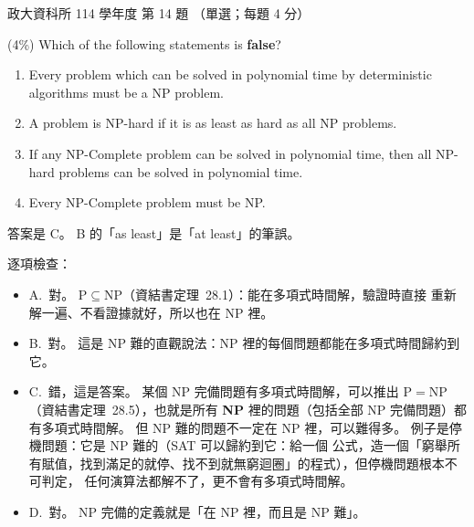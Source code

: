 \begin{pastexam}[label={px:nccu-114-dsa-14}]{政大資科所 114 學年度 第 14 題}
（單選；每題 4 分）

(4\%) Which of the following statements is \textbf{false}?
\begin{enumerate}[label=\Alph*.]
\item Every problem which can be solved in polynomial time by deterministic algorithms must be a NP
problem.
\item A problem is NP-hard if it is as least as hard as all NP problems.
\item If any NP-Complete problem can be solved in polynomial time, then all NP-hard problems can be
solved in polynomial time.
\item Every NP-Complete problem must be NP.
\end{enumerate}
\end{pastexam}

\begin{pastsoln}
答案是 C。 B 的「as least」是「at least」的筆誤。

逐項檢查：
\begin{itemize}
\item A.~對。 $\mathrm{P} \subseteq \mathrm{NP}$（資結書定理~28.1）：能在多項式時間解，驗證時直接
重新解一遍、不看證據就好，所以也在 NP 裡。
\item B.~對。 這是 NP 難的直觀說法：NP 裡的每個問題都能在多項式時間歸約到它。
\item C.~錯，這是答案。 某個 NP 完備問題有多項式時間解，可以推出 $\mathrm{P} = \mathrm{NP}$
（資結書定理~28.5），也就是所有 \textbf{NP} 裡的問題（包括全部 NP 完備問題）都有多項式時間解。 但
NP 難的問題不一定在 NP 裡，可以難得多。 例子是停機問題：它是 NP 難的（SAT 可以歸約到它：給一個
公式，造一個「窮舉所有賦值，找到滿足的就停、找不到就無窮迴圈」的程式），但停機問題根本不可判定，
任何演算法都解不了，更不會有多項式時間解。
\item D.~對。 NP 完備的定義就是「在 NP 裡，而且是 NP 難」。
\end{itemize}
\end{pastsoln}
